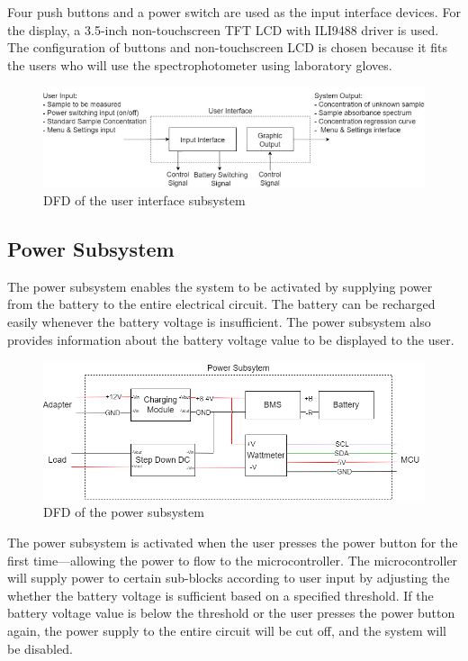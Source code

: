 \documentclass[conference]{IEEEtran}
\begin{document}
Four push buttons and a power switch are used as the input interface devices.
For the display, a 3.5-inch non-touchscreen TFT LCD with ILI9488 driver is used.
The configuration of buttons and non-touchscreen LCD is chosen because it fits the users who will use the spectrophotometer using laboratory gloves.

    \begin{figure}[htbp]
    \centerline{\includegraphics[scale=0.43]{ui-dfd.png}}
    \caption{DFD of the user interface subsystem}
    \label{ui-dfd}
    \end{figure}


\subsection{Power Subsystem}
The power subsystem enables the system to be activated by supplying power from the battery to the entire electrical circuit. The battery can be recharged easily whenever the battery voltage is insufficient. The power subsystem also provides information about the battery voltage value to be displayed to the user. 

    \begin{figure}[htbp]
    \centerline{\includegraphics[scale=0.3]{power-schematic.png}}
    \caption{DFD of the power subsystem}
    \label{power-dfd}
    \end{figure}

The power subsystem is activated when the user presses the power button for the first time—allowing the power to flow to the microcontroller. The microcontroller will supply power to certain sub-blocks according to user input by adjusting the whether the battery voltage is sufficient based on a specified threshold. If the battery voltage value is below the threshold or the user presses the power button again, the power supply to the entire circuit will be cut off, and the system will be disabled.
\end{document}
